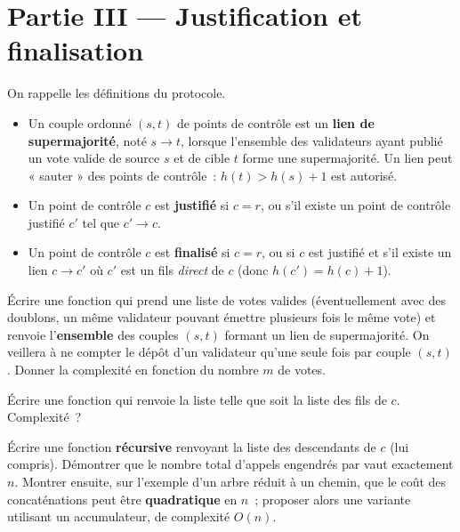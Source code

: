 \documentclass[11pt,a4paper]{article}
\begin{document}
\section*{Partie III --- Justification et finalisation}

On rappelle les définitions du protocole.

\begin{defi}[Casper]\leavevmode
\begin{itemize}[leftmargin=1.4em,itemsep=1pt]
\item Un couple ordonné $(s,t)$ de points de contrôle est un \textbf{lien de supermajorité},
noté $s\to t$, lorsque l'ensemble des validateurs ayant publié un vote valide de source $s$
et de cible $t$ forme une supermajorité. Un lien peut « sauter » des points de contrôle~:
$h(t)>h(s)+1$ est autorisé.
\item Un point de contrôle $c$ est \textbf{justifié} si $c=r$, ou s'il existe un point de
contrôle justifié $c'$ tel que $c'\to c$.
\item Un point de contrôle $c$ est \textbf{finalisé} si $c=r$, ou si $c$ est justifié et
s'il existe un lien $c\to c'$ où $c'$ est un fils \emph{direct} de $c$ (donc
$h(c')=h(c)+1$).
\end{itemize}
\end{defi}

\Q Écrire une fonction  qui prend une liste de
votes valides (éventuellement avec des doublons, un même validateur pouvant émettre
plusieurs fois le même vote) et renvoie l'\textbf{ensemble} des couples $(s,t)$ formant un
lien de supermajorité. On veillera à ne compter le dépôt d'un validateur qu'une seule fois
par couple $(s,t)$. Donner la complexité en fonction du nombre $m$ de votes.

\Q Écrire une fonction  qui renvoie la liste  telle que
 soit la liste des fils de $c$. Complexité~?

\Q Écrire une fonction \textbf{récursive}  renvoyant la liste des
descendants de $c$ (lui compris). Démontrer que le nombre total d'appels engendrés par
 vaut exactement $n$. Montrer ensuite, sur l'exemple d'un arbre réduit
à un chemin, que le coût des concaténations peut être \textbf{quadratique} en $n$~; proposer
alors une variante  utilisant un accumulateur, de complexité $O(n)$.
\end{document}
